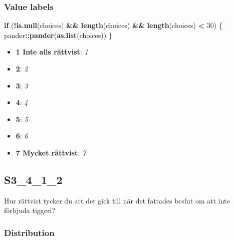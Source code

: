 \documentclass[]{book}
\newenvironment{Shaded}{\begin{snugshade}}{\end{snugshade}}
\newcommand{\KeywordTok}[1]{\textcolor[rgb]{0.13,0.29,0.53}{\textbf{#1}}}
\newcommand{\DecValTok}[1]{\textcolor[rgb]{0.00,0.00,0.81}{#1}}
\newcommand{\StringTok}[1]{\textcolor[rgb]{0.31,0.60,0.02}{#1}}
\newcommand{\ControlFlowTok}[1]{\textcolor[rgb]{0.13,0.29,0.53}{\textbf{#1}}}
\newcommand{\OperatorTok}[1]{\textcolor[rgb]{0.81,0.36,0.00}{\textbf{#1}}}
\newcommand{\NormalTok}[1]{#1}
\providecommand{\tightlist}{%
  \setlength{\itemsep}{0pt}\setlength{\parskip}{0pt}}
\begin{document}
\subsubsection{Value labels}\label{S3_4_1_1_labels}

\begin{Shaded}
\begin{Highlighting}[]
\ControlFlowTok{if}\NormalTok{ (}\OperatorTok{!}\KeywordTok{is.null}\NormalTok{(choices) }\OperatorTok{&&}\StringTok{ }\KeywordTok{length}\NormalTok{(choices) }\OperatorTok{&&}\StringTok{ }\KeywordTok{length}\NormalTok{(choices) }\OperatorTok{<}\StringTok{ }\DecValTok{30}\NormalTok{) \{}
\NormalTok{    pander}\OperatorTok{::}\KeywordTok{pander}\NormalTok{(}\KeywordTok{as.list}\NormalTok{(choices))}
\NormalTok{\}}
\end{Highlighting}
\end{Shaded}

\begin{itemize}
\tightlist
\item
  \textbf{1 Inte alls rättvist}: \emph{1}
\item
  \textbf{2}: \emph{2}
\item
  \textbf{3}: \emph{3}
\item
  \textbf{4}: \emph{4}
\item
  \textbf{5}: \emph{5}
\item
  \textbf{6}: \emph{6}
\item
  \textbf{7 Mycket rättvist}: \emph{7}
\end{itemize}

\subsection{S3\_4\_1\_2}\label{S3_4_1_2}

Hur rättvist tycker du att det gick till när det fattades beslut om att
inte förbjuda tiggeri?

\subsubsection{Distribution}\label{S3_4_1_2_distribution}
\end{document}
